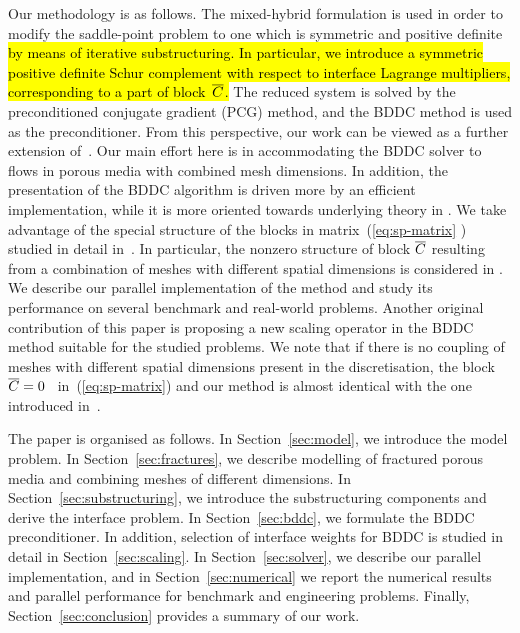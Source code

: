Our methodology is as follows. The mixed-hybrid formulation \cite{Maryska-1995-MHF,Oden-1977-DMH} is used in order
to modify the saddle-point problem to one which is symmetric and positive
definite \hl{by means of iterative substructuring. 
In particular, we 
introduce a symmetric positive definite Schur complement with respect to
interface Lagrange multipliers, corresponding to a part of block~$\overline{C}$.}
The
reduced system is solved by the preconditioned conjugate gradient (PCG)
method, and the BDDC method is used as the preconditioner. From this
perspective, our work can be viewed as a further extension
of~\cite{Tu-2007-BAF}. Our main effort here is in accommodating the BDDC
solver to flows in porous media with combined mesh dimensions. 
In addition, the presentation of the BDDC algorithm is driven more by an efficient implementation,
while it is more oriented towards underlying theory in \cite{Tu-2007-BAF}.
We take
advantage of the special structure of the blocks in matrix~(\ref{eq:sp-matrix}%
) studied in detail in~\cite{Maryska-1995-MHF,Maryska-2000-SCS,
Maryska-2005-NSF}. 
In particular,
the nonzero structure of block $\overline{C}$ resulting from a combination of meshes with
different spatial dimensions is considered
in \cite{Brezina-2010-MHF}. 
We describe our parallel
implementation of the method and study its performance on several benchmark
and real-world problems. Another original contribution of this paper is
proposing a new scaling operator in the BDDC method suitable for the studied
problems. We note that if there is no coupling of meshes with different
spatial dimensions present in the discretisation, the block $\overline{C}=0$%
\ in~(\ref{eq:sp-matrix}) and our method is almost identical with the one introduced
in~\cite{Tu-2007-BAF}.

The paper is organised as follows. In Section~\ref{sec:model}, we introduce
the model problem. In Section~\ref{sec:fractures}, we describe modelling of
fractured porous media and combining meshes of different dimensions. In
Section~\ref{sec:substructuring}, we introduce the substructuring components
and derive the interface problem. In Section~\ref{sec:bddc}, we formulate the
BDDC preconditioner. 
In addition, selection of interface weights for BDDC is studied in detail in Section~\ref{sec:scaling}.
In Section~\ref{sec:solver}, we describe our parallel
implementation, and in Section~\ref{sec:numerical} we report the numerical
results and parallel performance for benchmark and engineering problems.
Finally, Section~\ref{sec:conclusion} provides a summary of our work.

